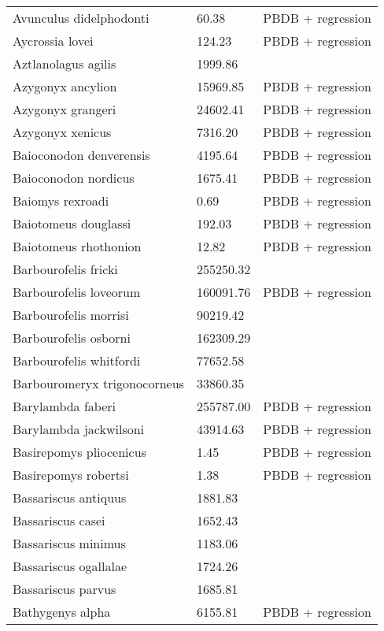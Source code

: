 \documentclass{article}
\begin{document}
\begin{center}
\begin{longtable}{p{} p{} p{}}
    Avunculus didelphodonti & 60.38 & PBDB + regression \\ 
    Aycrossia lovei & 124.23 & PBDB + regression \\ 
    Aztlanolagus agilis & 1999.86 & \cite{Smith2004} \\ 
    Azygonyx ancylion & 15969.85 & PBDB + regression \\ 
    Azygonyx grangeri & 24602.41 & PBDB + regression \\ 
    Azygonyx xenicus & 7316.20 & PBDB + regression \\ 
    Baioconodon denverensis & 4195.64 & PBDB + regression \\ 
    Baioconodon nordicus & 1675.41 & PBDB + regression \\ 
    Baiomys rexroadi & 0.69 & PBDB + regression \\ 
    Baiotomeus douglassi & 192.03 & PBDB + regression \\ 
    Baiotomeus rhothonion & 12.82 & PBDB + regression \\ 
    Barbourofelis fricki & 255250.32 & \cite{Tomiya2013} \\ 
    Barbourofelis loveorum & 160091.76 & PBDB + regression \\ 
    Barbourofelis morrisi & 90219.42 & \cite{Tomiya2013} \\ 
    Barbourofelis osborni & 162309.29 & \cite{Martin2002a} \\ 
    Barbourofelis whitfordi & 77652.58 & \cite{Tomiya2013} \\ 
    Barbouromeryx trigonocorneus & 33860.35 & \cite{Tomiya2013} \\ 
    Barylambda faberi & 255787.00 & PBDB + regression \\ 
    Barylambda jackwilsoni & 43914.63 & PBDB + regression \\ 
    Basirepomys pliocenicus & 1.45 & PBDB + regression \\ 
    Basirepomys robertsi & 1.38 & PBDB + regression \\ 
    Bassariscus antiquus & 1881.83 & \cite{Tomiya2013} \\ 
    Bassariscus casei & 1652.43 & \cite{Tomiya2013} \\ 
    Bassariscus minimus & 1183.06 & \cite{Robinson1966} \\ 
    Bassariscus ogallalae & 1724.26 & \cite{Gidley1920} \\ 
    Bassariscus parvus & 1685.81 & \cite{Tomiya2013} \\ 
    Bathygenys alpha & 6155.81 & PBDB + regression \\ 

\end{longtable}
\end{center}
\end{document}
